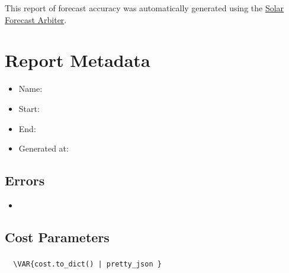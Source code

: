 \documentclass[12pt,letterpaper]{article}
\begin{document}
\title{}
\date{}
\maketitle
This report of forecast accuracy was automatically generated using the
\href{https://solarforecastarbiter.org}{Solar Forecast Arbiter}.

\tableofcontents
\cleardoublepage
\listoffigures
\cleardoublepage
\listoftables
\cleardoublepage

\section{Report Metadata}

\begin{itemize}
  \item Name: 
  \item Start: 
  \item End: 
  \item Generated at: 
\end{itemize}

\subsection{Errors}

\begin{itemize}
  \item {}
\end{itemize}

\subsection{Cost Parameters}
\subsubsection{}
\label{cost:\VAR{cost.name | html_to_tex | replace('_', '+')}}
\begin{verbatim}
  \VAR{cost.to_dict() | pretty_json }
\end{verbatim}
\end{document}
